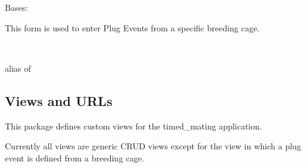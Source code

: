 \documentclass[letterpaper,10pt,english]{sphinxmanual}
\begin{document}
\begin{fulllineitems}
\label{api:timed_mating.forms.BreedingPlugForm}
Bases: 

This form is used to enter Plug Events from a specific breeding cage.

\begin{fulllineitems}
\label{api:timed_mating.forms.BreedingPlugForm.Meta}~

\begin{fulllineitems}
\label{api:timed_mating.forms.BreedingPlugForm.Meta.model}
alias of 

\end{fulllineitems}


\end{fulllineitems}


\begin{fulllineitems}
\label{api:timed_mating.forms.BreedingPlugForm.media}
\end{fulllineitems}


\end{fulllineitems}



\subsection{Views and URLs}
\label{api:id8}\label{api:module-timed_mating.views}
This package defines custom views for the timed\_mating application.

Currently all views are generic CRUD views except for the view in which a plug event is defined from a breeding cage.
\end{document}
